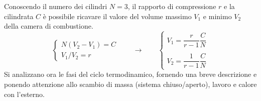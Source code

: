 \parttwo
Conoscendo il numero dei cilindri $N=3$, il rapporto di compressione $r$ e la cilindrata $C$ è possibile ricavare il valore del volume massimo $V_1$ e minimo $V_2$ della camera di combustione.
\begin{equation}
\begin{cases}
 N( V_2 - V_1 ) = C \\
 V_1 / V_2 = r
\end{cases} \qquad \rightarrow \qquad
\begin{cases}
 V_1 = \dfrac{r}{r-1} \dfrac{C}{N} \\ \\ 
 V_2 = \dfrac{1}{r-1} \dfrac{C}{N}
\end{cases} 
\end{equation}
Si analizzano ora le fasi del ciclo termodinamico, fornendo una breve descrizione e ponendo attenzione allo scambio di massa (sistema chiuso/aperto), lavoro e calore con l'esterno.
